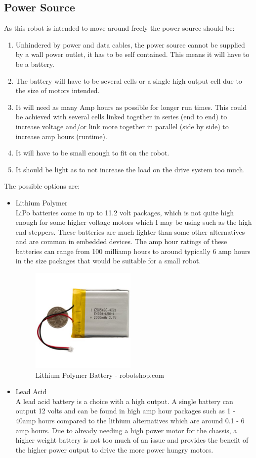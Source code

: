 \subsection{Power Source}
As this robot is intended to move around freely the power source should be:
\begin{enumerate}
\item Unhindered by power and data cables, the power source cannot be supplied by a wall power outlet, it has to be self contained.  This means it will have to be a battery.
\item The battery will have to be several cells or a single high output cell due to the size of motors intended.
\item It will need as many Amp hours as possible for longer run times.  This could be achieved with several cells linked together in series (end to end) to increase voltage and/or link more together in parallel (side by side) to increase amp hours (runtime).
\item It will have to be small enough to fit on the robot.
\item It should be light as to not increase the load on the drive system too much.
\end{enumerate}
The possible options are:
\begin{itemize}
\item Lithium Polymer
\\LiPo batteries come in up to 11.2 volt packages, which is not quite high enough for some higher voltage motors which I may be using such as the high end steppers.  These batteries are much lighter than some other alternatives and are common in embedded devices.  The amp hour ratings of these batteries can range from 100 milliamp hours to around typically 6 amp hours in the size packages that would be suitable for a small robot.
\begin{figure}[h]
\centering
        \includegraphics[width=2.0in] {Images/lipo-front.jpg}
        \caption{Lithium Polymer Battery - robotshop.com}
        \label{Lithium Polymer Battery}
\end{figure}

\item Lead Acid
\\A lead acid battery is a choice with a high output.  A single battery can output 12 volts and can be found in high amp hour packages such as 1 - 40amp hours compared to the lithium alternatives which are around 0.1 - 6 amp hours.  Due to already needing a high power motor for the chassis, a higher weight battery is not too much of an issue and provides the benefit of the higher power output to drive the more power hungry motors.
\end{itemize}
